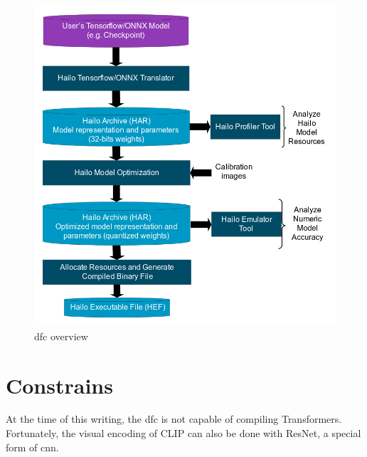 \begin{figure}
    \centering
    \includegraphics[width=\textwidth]{Images/Hardware/model_build_overview_with_onnx_and_hef_w_har.png}
    \caption{\Acrlong{dfc} overview }
    \label{fig:hardware:dfcoverview}
\end{figure}

\section{Constrains}
At the time of this writing, the \acrshort{dfc} is not capable of compiling Transformers.
Fortunately, the visual encoding of CLIP can also be done with ResNet, a special form of \Acrshort{cnn}.
